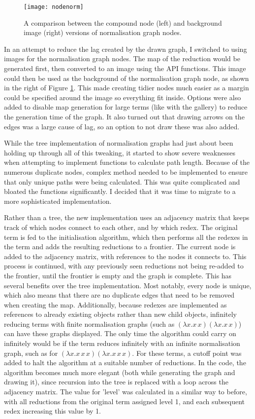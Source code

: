 \documentclass[11pt]{article}
\begin{document}
\begin{figure}
    \centering
    \texttt{[image: nodenorm]}
    \caption{A comparison between the compound node (left) and background image (right) versions of normalisation graph nodes.}
    \label{fig:normnodes}
\end{figure}

In an attempt to reduce the lag created by the drawn graph, I switched to using images for the normalisation graph nodes. The map of the reduction would be generated first, then converted to an image using the API functions. This image could then be used as the background of the normalisation graph node, as shown in the right of Figure \ref{fig:normnodes}. This made creating tidier nodes much easier as a margin could be specified around the image so everything fit inside. Options were also added to disable map generation for large terms (like with the gallery) to reduce the generation time of the graph. It also turned out that drawing arrows on the edges was a large cause of lag, so an option to not draw these was also added. 

While the tree implementation of normalisation graphs had just about been holding up through all of this tweaking, it started to show severe weaknesses when attempting to implement functions to calculate path length. Because of the numerous duplicate nodes, complex method needed to be implemented to ensure that only unique paths were being calculated. This was quite complicated and bloated the functions significantly. I decided that it was time to migrate to a more sophisticated implementation.

Rather than a tree, the new implementation uses an adjacency matrix that keeps track of which nodes connect to each other, and by which redex. The original term is fed to the initialisation algorithm, which then performs all the redexes in the term and adds the resulting reductions to a frontier. The current node is added to the adjacency matrix, with references to the nodes it connects to. This process is continued, with any previously seen reductions not being re-added to the frontier, until the frontier is empty and the graph is complete. This has several benefits over the tree implementation. Most notably, every node is unique, which also means that there are no duplicate edges that need to be removed when creating the map. Additionally, because redexes are implemented as references to already existing objects rather than new child objects, infinitely reducing terms with finite normalisation graphs (such as $(\lambda x. x \, x)(\lambda x. x \, x)$) can have these graphs displayed. The only time the algorithm could carry on infinitely would be if the term reduces infinitely with an infinite normalisation graph, such as for $(\lambda x. x \, x \, x)(\lambda x. x \, x \, x)$. For these terms, a cutoff point was added to halt the algorithm at a suitable number of reductions. In the code, the algorithm becomes much more elegant (both while generating the graph and drawing it), since recursion into the tree is replaced with a loop across the adjacency matrix. The value for 'level' was calculated in a similar way to before, with all reductions from the original term assigned level 1, and each subsequent redex increasing this value by 1.
\end{document}
